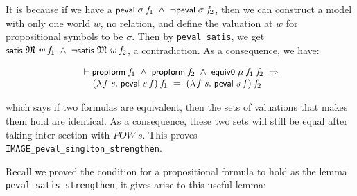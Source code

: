 \documentclass[letterpaper]{article}
\renewcommand{\HOLConst}[1]{{\textsf{\upshape\small #1}}}
\renewcommand{\HOLinline}[1]{\ensuremath{#1}}
\newenvironment{holmath}{\begin{displaymath}\begin{array}{l}}{\end{array}\end{displaymath}\ignorespacesafterend}
\begin{document}
It is because if we have a \HOLinline{\HOLConst{peval}\;\HOLFreeVar{\ensuremath{\sigma}}\;\HOLFreeVar{f\sb{\mathrm{1}}}\;\HOLSymConst{\HOLTokenConj{}}\;\HOLSymConst{\HOLTokenNeg{}}\HOLConst{peval}\;\HOLFreeVar{\ensuremath{\sigma}}\;\HOLFreeVar{f\sb{\mathrm{2}}}}, then we can construct a model with only one world $w$, no relation, and define the valuation at $w$ for propositional symbols to be $\sigma$. Then by \texttt{peval_satis}, we get \HOLinline{\HOLConst{satis}\;\HOLFreeVar{\ensuremath{\mathfrak{M}}}\;\HOLFreeVar{w}\;\HOLFreeVar{f\sb{\mathrm{1}}}\;\HOLSymConst{\HOLTokenConj{}}\;\HOLSymConst{\HOLTokenNeg{}}\HOLConst{satis}\;\HOLFreeVar{\ensuremath{\mathfrak{M}}}\;\HOLFreeVar{w}\;\HOLFreeVar{f\sb{\mathrm{2}}}}, a contradiction. As a consequence, we have:

\begin{holmath}
  \ensuremath{\HOLTokenTurnstile}\HOLConst{propform}\;\HOLFreeVar{f\sb{\mathrm{1}}}\;\HOLSymConst{\HOLTokenConj{}}\;\HOLConst{propform}\;\HOLFreeVar{f\sb{\mathrm{2}}}\;\HOLSymConst{\HOLTokenConj{}}\;\HOLConst{equiv0}\;\HOLFreeVar{\ensuremath{\mu}}\;\HOLFreeVar{f\sb{\mathrm{1}}}\;\HOLFreeVar{f\sb{\mathrm{2}}}\;\HOLSymConst{\HOLTokenImp{}}\\
\;\;\;\;\;(\HOLTokenLambda{}\HOLBoundVar{f}\;\HOLBoundVar{s}.\;\HOLConst{peval}\;\HOLBoundVar{s}\;\HOLBoundVar{f})\;\HOLFreeVar{f\sb{\mathrm{1}}}\;\HOLSymConst{=}\;(\HOLTokenLambda{}\HOLBoundVar{f}\;\HOLBoundVar{s}.\;\HOLConst{peval}\;\HOLBoundVar{s}\;\HOLBoundVar{f})\;\HOLFreeVar{f\sb{\mathrm{2}}}
\end{holmath}

which says if two formulas are equivalent, then the sets of valuations that makes them hold are identical. As a consequence, these two sets will still be equal after taking inter section with $POW\ s$. This proves \texttt{IMAGE_peval_singlton_strengthen}.

Recall we proved the condition for a propositional formula to hold as the lemma \texttt{peval_satis_strengthen}, it gives arise to this useful lemma:
\end{document}

